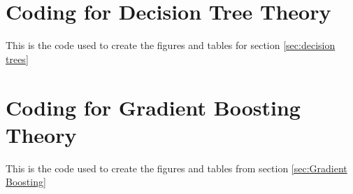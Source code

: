 
\newpage
\section{Coding for Decision Tree Theory}
This is the code used to create the figures and tables for section \ref{sec:decision trees}
\label{sec:appendix_dt}


\newpage
\section{Coding for Gradient Boosting Theory}
This is the code used to create the figures and tables from section \ref{sec:Gradient Boosting}
\label{sec:appendix_gb}

